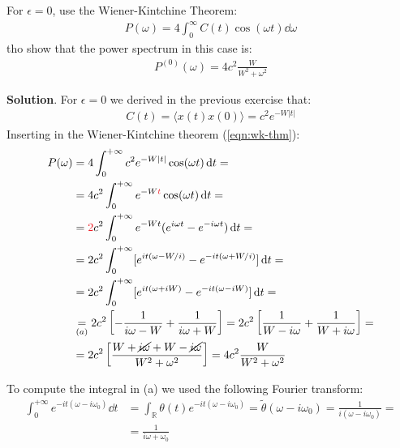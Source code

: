 \documentclass[../template.tex]{subfiles}
\begin{document}
\begin{exo}
    For $\epsilon=0$, use the Wiener-Kintchine Theorem:
    \begin{align} \label{eqn:wk-thm}
        P(\omega) = 4 \int_0^\infty C(t)\cos(\omega t) \dd{\omega}
    \end{align}
    tho show that the power spectrum in this case is:
    \begin{align*}
        P^{(0)}(\omega) = 4c^2 \frac{W}{W^2+ \omega^2} 
    \end{align*}

    \medskip

    \textbf{Solution}. For $\epsilon = 0$ we derived in the previous exercise that:
    \begin{align*}
        C(t) = \langle x(t) x(0) \rangle = c^2 e^{-W|t|}
    \end{align*}
    Inserting in the Wiener-Kintchine theorem (\ref{eqn:wk-thm}):
    \begin{align*}
        P(\omega) &= 4 \int_0^{+\infty} c^2 e^{-W|t|}\cos(\omega t) \dd{t} = \\
        &= 4c^2 \int_0^{+\infty} e^{-W\textcolor{Red}{t}} \cos(\omega t) \dd{t} =\\
        &= \textcolor{Red}{2} c^2 \int_0^{+\infty} e^{-Wt} (e^{i \omega t} - e^{-i \omega t}) \dd{t} = \\
        &= 2 c^2 \int_0^{+\infty} [e^{it(\omega - W/i)} - e^{-it(\omega + W/i)}] \dd{t} =\\
        &= 2c^2 \int_0^{+\infty} [e^{it(\omega + iW)} - e^{-it(\omega - iW)}]\dd{t} =\\
        &\underset{(a)}{=} 2c^2 \left[-\frac{1}{i \omega - W}  + \frac{1}{i \omega + W} \right] = 2c^2 \left[\frac{1}{W - i \omega} + \frac{1}{W + i \omega}  \right] =\\
        &= 2c^2 \left[\frac{W +\cancel{ i \omega} + W - \cancel{i \omega}}{W^2 + \omega^2} \right] = 4c^2 \frac{W}{W^2 + \omega^2} 
    \end{align*}

    To compute the integral in (a) we used the following Fourier transform:
    \begin{align*}
        \int_0^{+\infty} e^{-it (\omega - i \omega_0)} \dd{t} &= \int_{\mathbb{R}} \theta(t)e^{-it (\omega - i \omega_0)} = \tilde{\theta}(\omega - i \omega_0) = \frac{1}{i(\omega - i \omega_0)} =\\
        &= \frac{1}{i \omega + \omega_0}   
    \end{align*}
\end{exo}
\end{document}
